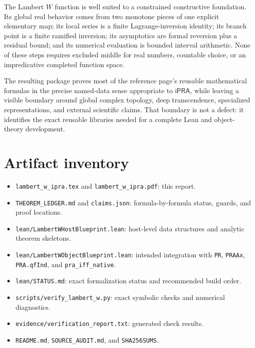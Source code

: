 \documentclass[11pt]{article}
\theoremstyle{definition}
\newcommand{\iPRA}{\mathsf{iPRA}}
\newcommand{\code}[1]{\nolinkurl{#1}}
\begin{document}
The Lambert \(W\) function is well suited to a constrained constructive
foundation.  Its global real behavior comes from two monotone pieces of one
explicit elementary map; its local series is a finite Lagrange-inversion
identity; its branch point is a finite ramified inversion; its asymptotics are
formal reversion plus a residual bound; and its numerical evaluation is bounded
interval arithmetic.  None of these steps requires excluded middle for real
numbers, countable choice, or an impredicative completed function space.

The resulting package proves most of the reference page's reusable mathematical
formulas in the precise named-data sense appropriate to \(\iPRA\), while
leaving a visible boundary around global complex topology, deep transcendence,
specialized representations, and external scientific claims.  That boundary is
not a defect: it identifies the exact reusable libraries needed for a complete
Lean and object-theory development.

\section*{Artifact inventory}
\begin{itemize}
\item \code{lambert\_w\_ipra.tex} and \code{lambert\_w\_ipra.pdf}: this report.
\item \code{THEOREM\_LEDGER.md} and \code{claims.json}: formula-by-formula status,
guards, and proof locations.
\item \code{lean/LambertWHostBlueprint.lean}: host-level data structures and
analytic theorem skeletons.
\item \code{lean/LambertWObjectBlueprint.lean}: intended integration with
\code{PR}, \code{PRAAx}, \code{PRA.qfInd}, and \code{pra\_iff\_native}.
\item \code{lean/STATUS.md}: exact formalization status and recommended build
order.
\item \code{scripts/verify\_lambert\_w.py}: exact symbolic checks and numerical
diagnostics.
\item \code{evidence/verification\_report.txt}: generated check results.
\item \code{README.md}, \code{SOURCE\_AUDIT.md}, and \code{SHA256SUMS}.
\end{itemize}
\end{document}
